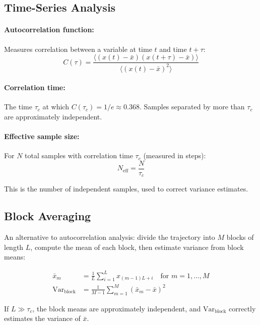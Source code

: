 \documentclass[11pt]{article}
\begin{document}
\subsection{Time-Series Analysis}

\paragraph{Autocorrelation function:} Measures correlation between a variable at time $t$ and time $t + \tau$:
\begin{equation}
C(\tau) = \frac{\langle (x(t) - \bar{x})(x(t+\tau) - \bar{x}) \rangle}{\langle (x(t) - \bar{x})^2 \rangle}
\end{equation}

\paragraph{Correlation time:} The time $\tau_c$ at which $C(\tau_c) = 1/e \approx 0.368$. Samples separated by more than $\tau_c$ are approximately independent.

\paragraph{Effective sample size:} For $N$ total samples with correlation time $\tau_c$ (measured in steps):
\begin{equation}
N_{\text{eff}} = \frac{N}{\tau_c}
\end{equation}

This is the number of independent samples, used to correct variance estimates.

\subsection{Block Averaging}

An alternative to autocorrelation analysis: divide the trajectory into $M$ blocks of length $L$, compute the mean of each block, then estimate variance from block means:

\begin{align}
\bar{x}_m &= \frac{1}{L}\sum_{i=1}^{L} x_{(m-1)L + i} \quad \text{for } m = 1, \ldots, M \\
\text{Var}_{\text{block}} &= \frac{1}{M-1}\sum_{m=1}^{M} (\bar{x}_m - \bar{x})^2
\end{align}

If $L \gg \tau_c$, the block means are approximately independent, and $\text{Var}_{\text{block}}$ correctly estimates the variance of $\bar{x}$.
\end{document}
